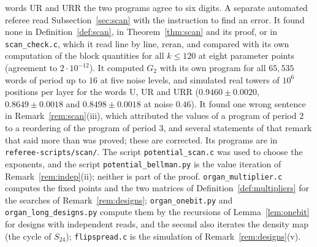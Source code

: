 \documentclass[11pt]{amsart}
\theoremstyle{definition}
\theoremstyle{remark}
\begin{document}
words $\mathrm{UR}$ and $\mathrm{URR}$ the two programs agree to six digits. A separate automated
referee read Subsection~\ref{sec:scan} with the instruction to find an error. It found none in
Definition~\ref{def:scan}, in Theorem~\ref{thm:scan} and its proof, or in
\texttt{scan\_check.c}, which it read line by line, reran, and compared with its own computation
of the block quantities for all $k\le120$ at eight parameter points (agreement to $2\cdot10^{-12}$).
It computed $G_2$ with its own program for all $65{,}535$ words of period up to $16$ at five
noise levels, and simulated real towers of $10^6$ positions per layer for the words
$\mathrm U$, $\mathrm{UR}$ and $\mathrm{URR}$ ($0.9460\pm0.0020$, $0.8649\pm0.0018$ and
$0.8498\pm0.0018$ at noise $0.46$). It found one wrong sentence in Remark~\ref{rem:scan}(iii),
which attributed the values of a program of period $2$ to a reordering of the program of period
$3$, and several statements of that remark that said more than was proved; these are corrected.
Its programs are in \texttt{referee-scripts/scan/}. The script \texttt{potential\_scan.c} was used to choose the exponents,
and the script \texttt{potential\_bellman.py} is the value iteration of Remark~\ref{rem:indep}(ii);
neither is part of the proof. \texttt{organ\_multiplier.c} computes the
fixed points and the two matrices of Definition~\ref{def:multipliers} for the searches of
Remark~\ref{rem:designs}; \texttt{organ\_onebit.py} and \texttt{organ\_long\_designs.py} compute
them by the recursions of Lemma~\ref{lem:onebit} for designs with independent reads, and the second
also iterates the density map (the cycle of $S_{24}$); \texttt{flipspread.c} is the simulation of
Remark~\ref{rem:designs}(v).
\end{document}
